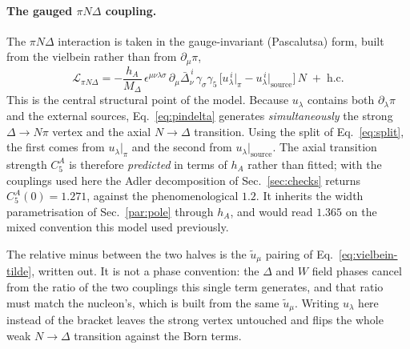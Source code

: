 \documentclass[11pt,a4paper]{article}
\begin{document}
\paragraph{The gauged $\pi N\Delta$ coupling.}
The $\pi N \Delta$ interaction is taken in the gauge-invariant (Pascalutsa)
form, built from the vielbein rather than from $\partial_\mu\pi$,
\begin{equation}
  \mathcal{L}_{\pi N \Delta}
  = -\frac{h_A}{M_\Delta}\,
    \epsilon^{\mu\nu\lambda\sigma}\,
    \partial_\mu \bar\Delta_{\nu}^{\,i}\,
    \gamma_\sigma\gamma_5\,
    \Big[u_\lambda^{\,i}\Big|_{\pi}
       - u_\lambda^{\,i}\Big|_{\text{source}}\Big]\, N
  \;+\; \mathrm{h.c.}
  \label{eq:pindelta}
\end{equation}
This is the central structural point of the model. Because $u_\lambda$ contains
both $\partial_\lambda \pi$ and the external sources, Eq.~\eqref{eq:pindelta}
generates \emph{simultaneously} the strong $\Delta\to N\pi$ vertex and the axial
$N\to\Delta$ transition. Using the split of Eq.~\eqref{eq:split}, the first
comes from $u_\lambda|_\pi$ and the second from $u_\lambda|_{\text{source}}$.
The axial transition strength $C_5^A$ is therefore \emph{predicted} in terms of
$h_A$ rather than fitted; with the couplings used here the Adler decomposition
of Sec.~\ref{sec:checks} returns $C_5^A(0) = 1.271$, against the
phenomenological $1.2$. It inherits the width parametrisation of
Sec.~\ref{par:pole} through $h_A$, and would read $1.365$ on the mixed
convention this model used previously.

The relative minus between the two halves is the $\tilde u_\mu$ pairing of
Eq.~\eqref{eq:vielbein-tilde}, written out. It is not a phase convention: the
$\Delta$ and $W$ field phases cancel from the ratio of the two couplings this
single term generates, and that ratio must match the nucleon's, which is built
from the same $\tilde u_\mu$. Writing $u_\lambda$ here instead of the bracket
leaves the strong vertex untouched and flips the whole weak $N\to\Delta$
transition against the Born terms.
\end{document}
